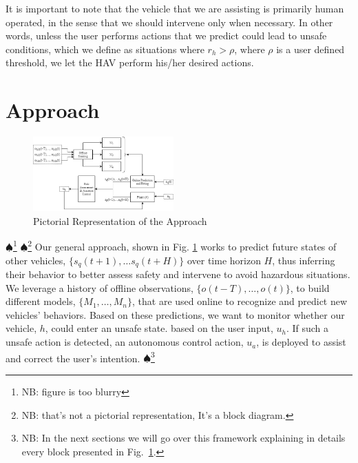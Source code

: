 \documentclass[letterpaper, 10 pt, conference]{ieeeconf}  %
\newcommand\NB[1]{$\spadesuit$\footnote{NB: #1}}
\begin{document}
    It is important to note that the vehicle that we are assisting is primarily human operated, in the sense that we should intervene only when necessary. %
    In other words, unless the user performs actions that we predict could lead to unsafe conditions, which we define as situations where $r_h>\rho$, where $\rho$ is a user defined threshold, we let the HAV perform his/her desired actions.

\section{Approach} \label{sec:approach}%
\begin{figure}[ht!]
    \includegraphics[width=0.48\textwidth]{approach.png}
    \caption{Pictorial Representation of the Approach}
    \label{fig:app}
\end{figure}
\NB{figure is too blurry}
\NB{that's not a pictorial representation, It's a block diagram.}
Our general approach, shown in Fig. \ref{fig:app} works to predict future states of other vehicles, $\{s_q(t+1),\ldots s_q(t+H)\}$ over time horizon $H$, thus inferring their behavior to better assess safety and intervene to avoid hazardous situations. We leverage a history of offline observations, $\{o(t-T),\ldots,o(t)\}$, to build different models, $\{M_1,\ldots,M_n\}$, that are used online to recognize and predict new vehicles' behaviors. Based on these predictions, we want to monitor whether our vehicle, $h$, could enter an unsafe state.
 based on the user input, $u_h$. 
 If such a unsafe action is detected, an autonomous control action, $u_a$, is deployed to assist and correct the user's intention.
 \NB{In  the next sections we will go over this framework explaining in details every block presented in Fig.~\ref{fig:app}.}
 

\end{document}
